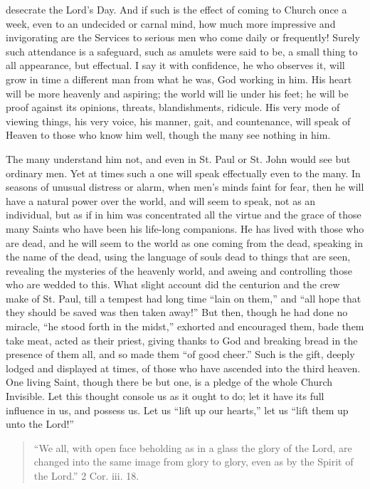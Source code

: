 desecrate the Lord's Day. And if such is the effect of coming to
Church once a week, even to an undecided or carnal mind, how much more
impressive and invigorating are the Services to serious men who come
daily or frequently! Surely such attendance is a safeguard, such as
amulets were said to be, a small thing to all appearance, but
effectual. I say it with confidence, he who observes it, will grow in
time a different man from what he was, God working in him. His heart
will be more heavenly and aspiring; the world will lie under his feet;
he will be proof against its opinions, threats, blandishments,
ridicule. His very mode of viewing things, his very voice, his manner,
gait, and countenance, will speak of Heaven to those who know him
well, though the many see nothing in him.

The many understand him not, and even in St. Paul or St. John would
see but ordinary men. Yet at times such a one will speak effectually
even to the many. In seasons of unusual distress or alarm, when men's
minds faint for fear, then he will have a natural power over the
world, and will seem to speak, not as an individual, but as if in him
was concentrated all the virtue and the grace of those many Saints who
have been his life-long companions. He has lived with those who are
dead, and he will seem to the world as one coming from the dead,
speaking in the name of the dead, using the language of souls dead to
things that are seen, revealing the mysteries of the heavenly world,
and aweing and controlling those who are wedded to this. What slight
account did the centurion and the crew make of St. Paul, till a
tempest had long time ``lain on them,'' and ``all hope
that they should be saved was then taken away!'' But then, though he had
done no miracle, ``he stood forth in the midst,'' exhorted and
encouraged them, bade them take meat, acted as their priest, giving
thanks to God and breaking bread in the presence of them all, and so
made them ``of good cheer.'' Such is the gift, deeply lodged
and displayed at times, of those who have ascended into the third
heaven. One living Saint, though there be but one, is a pledge of the
whole Church Invisible. Let this thought console us as it ought to do;
let it have its full influence in us, and possess us. Let us
``lift up our hearts,'' let us ``lift them up unto the
Lord!''


\begin{quote}

``We all, with open face beholding as in a glass the glory of
the Lord, are changed into the same image from glory to glory, even
as by the Spirit of the Lord.'' 2 Cor. iii. 18.

\end{quote}

